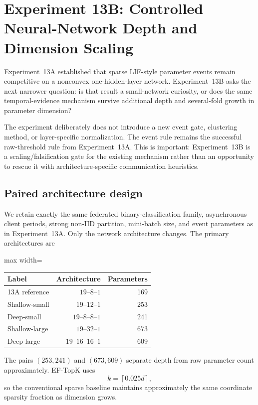 \section{Experiment 13B: Controlled Neural-Network Depth and Dimension Scaling}
\label{sec:experiment-13b-depth}

Experiment~13A established that sparse LIF-style parameter events remain competitive on a nonconvex one-hidden-layer network. Experiment~13B asks the next narrower question: is that result a small-network curiosity, or does the same temporal-evidence mechanism survive additional depth and several-fold growth in parameter dimension?

The experiment deliberately does not introduce a new event gate, clustering method, or layer-specific normalization. The event rule remains the successful raw-threshold rule from Experiment~13A. This is important: Experiment~13B is a scaling/falsification gate for the existing mechanism rather than an opportunity to rescue it with architecture-specific communication heuristics.

\subsection{Paired architecture design}

We retain exactly the same federated binary-classification family, asynchronous client periods, strong non-IID partition, mini-batch size, and event parameters as in Experiment~13A. Only the network architecture changes. The primary architectures are
\begin{center}
\begin{adjustbox}{max width=\textwidth}
\begin{tabular}{lrr}
\toprule
Label & Architecture & Parameters\\
\midrule
13A reference & $19$--$8$--$1$ & 169\\
Shallow-small & $19$--$12$--$1$ & 253\\
Deep-small & $19$--$8$--$8$--$1$ & 241\\
Shallow-large & $19$--$32$--$1$ & 673\\
Deep-large & $19$--$16$--$16$--$1$ & 609\\
\bottomrule
\end{tabular}
\end{adjustbox}
\end{center}
The pairs $(253,241)$ and $(673,609)$ separate depth from raw parameter count approximately. EF-TopK uses
\begin{equation}
 k=\left\lceil0.025d\right\rceil,
\end{equation}
so the conventional sparse baseline maintains approximately the same coordinate sparsity fraction as dimension grows.

